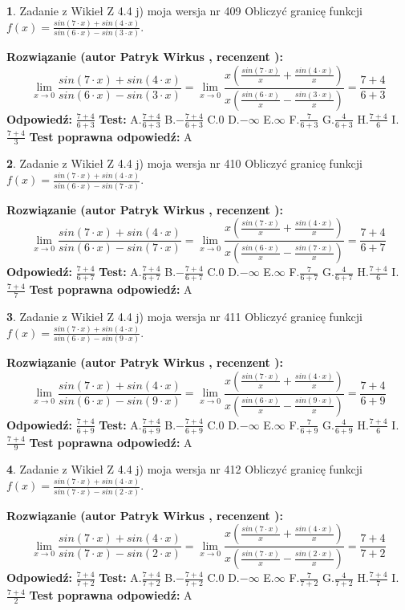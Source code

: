 \documentclass[12pt, a4paper]{article}
\theoremstyle{definition} %
\newtheorem{zad}{}
\newcommand{\zadStart}[1]{\begin{zad}#1\newline}
\newcommand{\zadStop}{\end{zad}}
\newcommand{\rozwStart}[2]{\noindent \textbf{Rozwiązanie (autor #1 , recenzent #2): }\newline}
\newcommand{\rozwStop}{\newline}
\newcommand{\odpStart}{\noindent \textbf{Odpowiedź:}\newline}
\newcommand{\odpStop}{\newline}
\newcommand{\testStart}{\noindent \textbf{Test:}\newline}
\newcommand{\testStop}{\newline}
\newcommand{\kluczStart}{\noindent \textbf{Test poprawna odpowiedź:}\newline}
\newcommand{\kluczStop}{\newline}
\begin{document}
\zadStart{Zadanie z Wikieł Z 4.4 j) moja wersja nr 409}
Obliczyć granicę funkcji $f(x)=\frac{sin(7\cdot x) +sin(4\cdot x)}{sin(6\cdot x) -sin(3\cdot x)}$.
\zadStop
\rozwStart{Patryk Wirkus}{}
$$\lim\limits_{x\to 0}\frac{sin(7\cdot x) +sin(4\cdot x)}{sin(6\cdot x) -sin(3\cdot x)}=\lim\limits_{x\to 0}\frac{x(\frac{sin(7\cdot x)}{x}+\frac{sin(4\cdot x)}{x})}{x(\frac{sin(6\cdot x)}{x}-\frac{sin(3\cdot x)}{x})}=\frac{7+4}{6+3}$$
\rozwStop
\odpStart
$\frac{7+4}{6+3}$
\odpStop
\testStart
A.$\frac{7+4}{6+3}$
B.$-\frac{7+4}{6+3}$
C.$0$
D.$-\infty$
E.$\infty$
F.$\frac{7}{6+3}$
G.$\frac{4}{6+3}$
H.$\frac{7+4}{6}$
I.$\frac{7+4}{3}$
\testStop
\kluczStart
A
\kluczStop



\zadStart{Zadanie z Wikieł Z 4.4 j) moja wersja nr 410}
Obliczyć granicę funkcji $f(x)=\frac{sin(7\cdot x) +sin(4\cdot x)}{sin(6\cdot x) -sin(7\cdot x)}$.
\zadStop
\rozwStart{Patryk Wirkus}{}
$$\lim\limits_{x\to 0}\frac{sin(7\cdot x) +sin(4\cdot x)}{sin(6\cdot x) -sin(7\cdot x)}=\lim\limits_{x\to 0}\frac{x(\frac{sin(7\cdot x)}{x}+\frac{sin(4\cdot x)}{x})}{x(\frac{sin(6\cdot x)}{x}-\frac{sin(7\cdot x)}{x})}=\frac{7+4}{6+7}$$
\rozwStop
\odpStart
$\frac{7+4}{6+7}$
\odpStop
\testStart
A.$\frac{7+4}{6+7}$
B.$-\frac{7+4}{6+7}$
C.$0$
D.$-\infty$
E.$\infty$
F.$\frac{7}{6+7}$
G.$\frac{4}{6+7}$
H.$\frac{7+4}{6}$
I.$\frac{7+4}{7}$
\testStop
\kluczStart
A
\kluczStop



\zadStart{Zadanie z Wikieł Z 4.4 j) moja wersja nr 411}
Obliczyć granicę funkcji $f(x)=\frac{sin(7\cdot x) +sin(4\cdot x)}{sin(6\cdot x) -sin(9\cdot x)}$.
\zadStop
\rozwStart{Patryk Wirkus}{}
$$\lim\limits_{x\to 0}\frac{sin(7\cdot x) +sin(4\cdot x)}{sin(6\cdot x) -sin(9\cdot x)}=\lim\limits_{x\to 0}\frac{x(\frac{sin(7\cdot x)}{x}+\frac{sin(4\cdot x)}{x})}{x(\frac{sin(6\cdot x)}{x}-\frac{sin(9\cdot x)}{x})}=\frac{7+4}{6+9}$$
\rozwStop
\odpStart
$\frac{7+4}{6+9}$
\odpStop
\testStart
A.$\frac{7+4}{6+9}$
B.$-\frac{7+4}{6+9}$
C.$0$
D.$-\infty$
E.$\infty$
F.$\frac{7}{6+9}$
G.$\frac{4}{6+9}$
H.$\frac{7+4}{6}$
I.$\frac{7+4}{9}$
\testStop
\kluczStart
A
\kluczStop



\zadStart{Zadanie z Wikieł Z 4.4 j) moja wersja nr 412}
Obliczyć granicę funkcji $f(x)=\frac{sin(7\cdot x) +sin(4\cdot x)}{sin(7\cdot x) -sin(2\cdot x)}$.
\zadStop
\rozwStart{Patryk Wirkus}{}
$$\lim\limits_{x\to 0}\frac{sin(7\cdot x) +sin(4\cdot x)}{sin(7\cdot x) -sin(2\cdot x)}=\lim\limits_{x\to 0}\frac{x(\frac{sin(7\cdot x)}{x}+\frac{sin(4\cdot x)}{x})}{x(\frac{sin(7\cdot x)}{x}-\frac{sin(2\cdot x)}{x})}=\frac{7+4}{7+2}$$
\rozwStop
\odpStart
$\frac{7+4}{7+2}$
\odpStop
\testStart
A.$\frac{7+4}{7+2}$
B.$-\frac{7+4}{7+2}$
C.$0$
D.$-\infty$
E.$\infty$
F.$\frac{7}{7+2}$
G.$\frac{4}{7+2}$
H.$\frac{7+4}{7}$
I.$\frac{7+4}{2}$
\testStop
\kluczStart
A
\kluczStop
\end{document}
